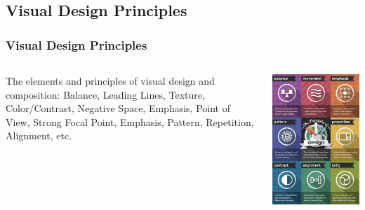 \documentclass{beamer}
\begin{document}
			\subsection{Visual Design Principles}		
				\begin{frame}
					\frametitle{Visual Design Principles}
					\begin{columns}
						\vspace{-25pt}
						\begin{outline}
							\1 The elements and principles of visual design and composition: 
							\2 Balance, Leading Lines, Texture, 
							\2 Color/Contrast, Negative Space, 
							\2 Emphasis, Point of View,
							\2 Strong Focal Point, Emphasis,
							\2 Pattern, Repetition, 
							\2 Alignment, etc.
						\end{outline}
						\includegraphics[width=1.0\textwidth]{images/principles of design.jpeg}
					\end{columns}
					
				\end{frame}
			
\end{document}
